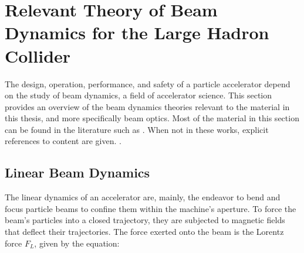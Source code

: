\chapter{Relevant Theory of Beam Dynamics for the Large Hadron Collider} %

\label{Chapter:Theory} %


The design, operation, performance, and safety of a particle accelerator depend on the study of beam dynamics, a field of accelerator science.
This section provides an overview of the beam dynamics theories relevant to the material in this thesis, and more specifically beam optics.
Most of the material in this section can be found in the literature such as \cite{BOOK:Wilson:Introcution_Particle_Accelerators, BOOK:Lee:Accelerator_physics, BOOK:Wiedemann:Particle_Accelerator_Physics, BOOK:Minty:Measurements_Control_Charged_Particle_Beams,BOOK:Wolski:Beam_dynamics,BOOK:Chao:Handbook_Accelerator_Physics_Engineering, BOOK:Chao:Collective_instabilities}.
When not in these works, explicit references to content are given.
.


\section{Linear Beam Dynamics}

The linear dynamics of an accelerator are, mainly, the endeavor to bend and focus particle beams to confine them within the machine's aperture.
To force the beam's particles into a closed trajectory, they are subjected to magnetic fields that deflect their trajectories.
The force exerted onto the beam is the Lorentz force \(F_{L}\), given by the equation:

